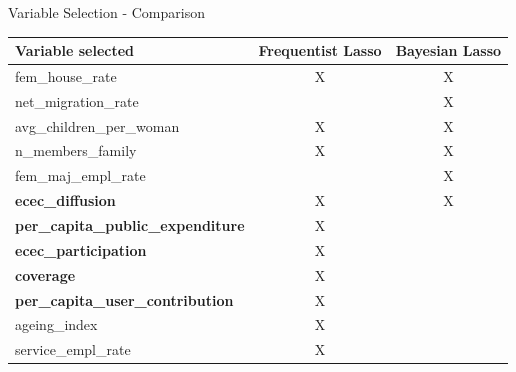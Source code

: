 \begin{frame}{Variable Selection - Comparison}

    \begin{table}[h!]
    \centering
    \footnotesize
        \begin{tabular}{lcc}
            \hline
            \textbf{Variable selected} & \textbf{Frequentist Lasso} & \textbf{Bayesian Lasso} \\
            \hline
            fem\_house\_rate                  & X & X \\
            net\_migration\_rate             &  & X \\
            avg\_children\_per\_woman        & X & X \\
            n\_members\_family               & X & X \\
            fem\_maj\_empl\_rate             &  & X \\
            \textbf{ecec\_diffusion}                  & X & X \\
            \textbf{per\_capita\_public\_expenditure} & X &  \\
            \textbf{ecec\_participation}              & X &  \\
            \textbf{coverage}                         & X &  \\
            \textbf{per\_capita\_user\_contribution}  & X &  \\
            ageing\_index                    & X &  \\
            service\_empl\_rate              & X &  \\
            \hline
        \end{tabular}
    \end{table}

\end{frame}